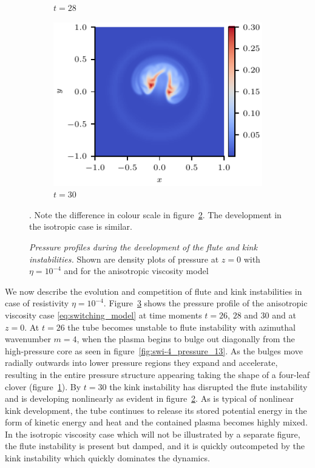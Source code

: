 \documentclass[fleqn,usenatbib]{mnras}
\newcommand{\mycaption}[2]{\caption[#1]{\emph{#1} #2}}
\begin{document}
\begin{figure}
\begin{subfigure}{0.32\textwidth}
      \caption{$t=28$}
      \label{fig:swi-4_pressure_14}
    \end{subfigure}
    \hfill
    \begin{subfigure}{0.32\textwidth}
      \includegraphics[width=\linewidth]{swi-4_pressure_15.pdf}
      \caption{$t=30$}
      \label{fig:swi-4_pressure_15}
    \end{subfigure}
\mycaption{Pressure profiles during the development of the
  flute and kink instabilities.}{Shown are
  density plots of pressure at $z=0$
  with $\eta = 10^{-4}$ 
  and for the anisotropic viscosity model}. Note the difference in colour scale
  in figure~\ref{fig:swi-4_pressure_15}. The development in the
  isotropic case is similar. 
\label{fig:kink_pressure_slices-4}%
\end{figure}

We now describe the evolution and competition of flute and
  kink instabilities in case of resistivity $\eta=10^{-4}$.
Figure~\ref{fig:kink_pressure_slices-4} shows the pressure profile
of the anisotropic viscosity case 
\eqref{eq:switching_model} at
time moments $t=26$, $28$ and $30$ and at $z=0$. At $t=26$
the tube becomes unstable to  flute
instability with azimuthal wavenumber $m=4$, when the
plasma begins to  bulge out diagonally from the
high-pressure core as seen in figure~\ref{fig:swi-4_pressure_13}. As  
the bulges move radially outwards into lower pressure regions they
expand and accelerate, resulting in the entire pressure structure
appearing taking the shape of a four-leaf clover (figure~\ref{fig:swi-4_pressure_14}). By
$t=30$ the kink instability has disrupted the flute
instability and is developing nonlinearly
as evident in figure~\ref{fig:swi-4_pressure_15}. As is typical of nonlinear kink
development, the tube continues to release its stored potential energy
in the form of kinetic energy and heat and the contained plasma becomes highly
mixed. In the  isotropic viscosity case
which will not be illustrated by a separate figure, the
flute instability is present but damped, and it is
  quickly outcompeted by the kink instability which quickly dominates the dynamics. 
\end{document}
